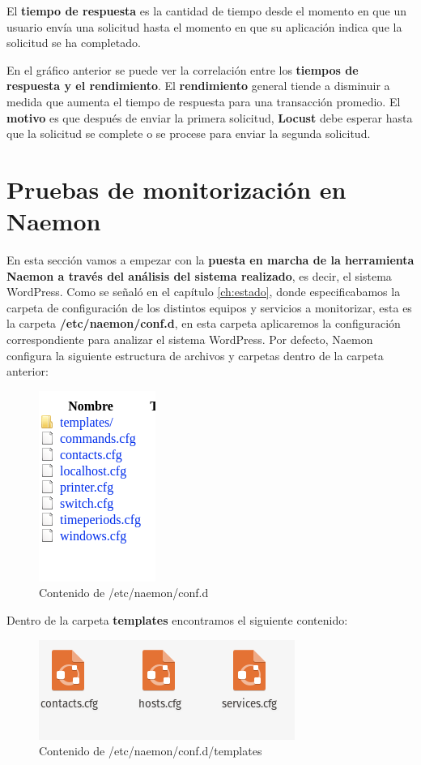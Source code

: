 El \textbf{tiempo de respuesta }es la cantidad de tiempo desde el momento en que un usuario envía una solicitud hasta el momento en que su aplicación indica que la solicitud se ha completado.
 
En el gráfico anterior se puede ver la correlación entre los \textbf{tiempos de respuesta y el rendimiento}. El \textbf{rendimiento} general tiende a disminuir a medida que aumenta el tiempo de respuesta para una transacción promedio. El \textbf{motivo} es que después de enviar la primera solicitud, \textbf{Locust} debe esperar hasta que la solicitud se complete o se procese para enviar la segunda solicitud. 

\section{Pruebas de monitorización en Naemon}
En esta sección vamos a empezar con  la \textbf{puesta en marcha de la herramienta Naemon a través del análisis del sistema realizado}, es decir, el sistema WordPress. Como se señaló en el capítulo \ref{ch:estado}, donde especificabamos la carpeta de configuración de los distintos equipos y servicios a monitorizar, esta es la carpeta \textbf{/etc/naemon/conf.d}, en esta carpeta aplicaremos la configuración correspondiente para analizar el sistema WordPress.
\newpage
Por defecto, Naemon configura la siguiente estructura de archivos y carpetas dentro de la carpeta anterior:
\begin{figure}[H]
	\centering
	\includegraphics[scale=0.7]{imagenes/wordpress/analisis_naemon/estructura_1.png}
	\caption{Contenido de /etc/naemon/conf.d} \label{conf}
\end{figure}
Dentro de la carpeta \textbf{templates} encontramos el siguiente contenido:
\begin{figure}[H]
	\centering
	\includegraphics[scale=0.5]{imagenes/wordpress/analisis_naemon/estructura_templates.png}
	\caption{Contenido de /etc/naemon/conf.d/templates} \label{templates}
\end{figure}

